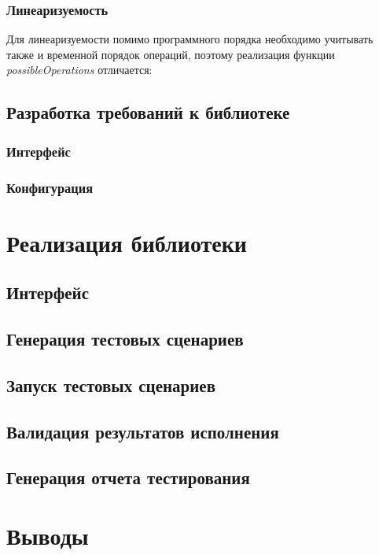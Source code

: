 \documentclass[14pt, openany]{book}
\begin{document}
\subsection{Линеаризуемость}
Для линеаризуемости помимо программного порядка необходимо учитывать также и временной порядок операций, поэтому реализация функции \emph{possibleOperations} отличается:


\section{Разработка требований к библиотеке}

\subsection{Интерфейс}

\subsection{Конфигурация}

\chapter{Реализация библиотеки}

\section{Интерфейс}

\section{Генерация тестовых сценариев}

\section{Запуск тестовых сценариев}

\section{Валидация результатов исполнения}

\section{Генерация отчета тестирования}

\chapter{Выводы}



\end{document}
